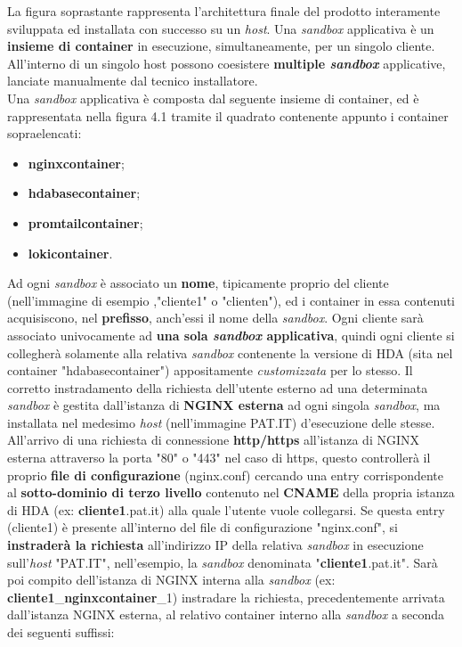 La figura soprastante rappresenta l'architettura finale del prodotto interamente sviluppata ed installata con successo su un \textit{host}. 
Una \textit{sandbox} applicativa è un \textbf{insieme di container} in esecuzione, simultaneamente, per un singolo cliente. All'interno di un singolo host possono coesistere \textbf{multiple \textit{sandbox}} applicative, lanciate manualmente dal tecnico installatore.\\
Una \textit{sandbox} applicativa è composta dal seguente insieme di container, ed è rappresentata nella figura 4.1 tramite il quadrato contenente appunto i container sopraelencati:
\begin{itemize}
	\item \textbf{nginxcontainer};
	\item \textbf{hdabasecontainer};
	\item \textbf{promtailcontainer};
	\item \textbf{lokicontainer}.
\end{itemize}
Ad ogni \textit{sandbox} è associato un \textbf{nome}, tipicamente proprio del cliente (nell'immagine di esempio ,"cliente1" o "clienten"), ed i container in essa contenuti acquisiscono, nel \textbf{prefisso}, anch'essi il nome della \textit{sandbox}. Ogni cliente sarà associato univocamente ad \textbf{una sola \textit{sandbox} applicativa}, quindi ogni cliente si collegherà solamente alla relativa \textit{sandbox} contenente la versione di HDA (sita nel container "hdabasecontainer") appositamente \textit{customizzata} per lo stesso.
Il corretto instradamento della richiesta dell'utente esterno ad una determinata \textit{sandbox} è gestita dall'istanza di \textbf{NGINX esterna} ad ogni singola \textit{sandbox}, ma installata nel medesimo \textit{host} (nell'immagine PAT.IT) d'esecuzione delle stesse. \\
All'arrivo di una richiesta di connessione \textbf{http/https} all'istanza di NGINX esterna attraverso la porta "80" o "443" nel caso di https, questo controllerà il proprio \textbf{file di configurazione} (nginx.conf) cercando una entry corrispondente al \textbf{sotto-dominio di terzo livello} contenuto nel \textbf{\gls{CNAME}} della propria istanza di HDA (ex: \textbf{cliente1}.pat.it) alla quale l'utente vuole collegarsi. Se questa entry (cliente1) è presente all'interno del file di configurazione "nginx.conf", si \textbf{instraderà la richiesta} all'indirizzo IP della relativa \textit{sandbox} in esecuzione sull'\textit{host} "PAT.IT", nell'esempio, la \textit{sandbox} denominata "\textbf{cliente1}.pat.it". Sarà poi compito dell'istanza di NGINX interna alla \textit{sandbox} (ex: \textbf{cliente1}\_\textbf{nginxcontainer}\_1) instradare la richiesta, precedentemente arrivata dall'istanza NGINX esterna, al relativo container interno alla \textit{sandbox} a seconda dei seguenti suffissi:
